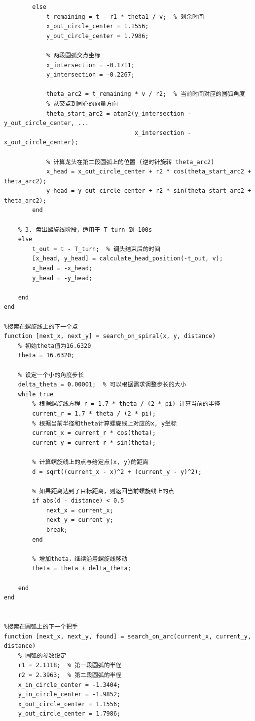\documentclass{cumcmthesis1}
\begin{document}
\begin{lstlisting}[caption={求解问题5的代码，将过程和结果打印到控制台上}, label={lst:tenth_code}]
        % 第二段圆弧运动：从 r1 * theta1 到 T_turn
        else
            t_remaining = t - r1 * theta1 / v;  % 剩余时间
            x_out_circle_center = 1.1556;
            y_out_circle_center = 1.7986;
            
            % 两段圆弧交点坐标
            x_intersection = -0.1711;
            y_intersection = -0.2267;
            
            theta_arc2 = t_remaining * v / r2;  % 当前时间对应的圆弧角度
            % 从交点到圆心的向量方向
            theta_start_arc2 = atan2(y_intersection - y_out_circle_center, ...
                                     x_intersection - x_out_circle_center);
                                 
            % 计算龙头在第二段圆弧上的位置 (逆时针旋转 theta_arc2)
            x_head = x_out_circle_center + r2 * cos(theta_start_arc2 + theta_arc2);  
            y_head = y_out_circle_center + r2 * sin(theta_start_arc2 + theta_arc2);  
        end
    
    % 3. 盘出螺旋线阶段，适用于 T_turn 到 100s
    else
        t_out = t - T_turn;  % 调头结束后的时间
        [x_head, y_head] = calculate_head_position(-t_out, v);
        x_head = -x_head;
        y_head = -y_head;
        
    end
end

%搜索在螺旋线上的下一个点
function [next_x, next_y] = search_on_spiral(x, y, distance)
    % 初始theta值为16.6320
    theta = 16.6320;
    
    % 设定一个小的角度步长
    delta_theta = 0.00001;  % 可以根据需求调整步长的大小
    while true
        % 根据螺旋线方程 r = 1.7 * theta / (2 * pi) 计算当前的半径
        current_r = 1.7 * theta / (2 * pi);
        % 根据当前半径和theta计算螺旋线上对应的x, y坐标
        current_x = current_r * cos(theta);
        current_y = current_r * sin(theta);
        
        % 计算螺旋线上的点与给定点(x, y)的距离
        d = sqrt((current_x - x)^2 + (current_y - y)^2);
        
        % 如果距离达到了目标距离，则返回当前螺旋线上的点
        if abs(d - distance) < 0.5
            next_x = current_x;
            next_y = current_y;
            break;
        end
        
        % 增加theta，继续沿着螺旋线移动
        theta = theta + delta_theta;

    end
end


%搜索在圆弧上的下一个把手
function [next_x, next_y, found] = search_on_arc(current_x, current_y, distance)
    % 圆弧的参数设定
    r1 = 2.1118;  % 第一段圆弧的半径
    r2 = 2.3963;  % 第二段圆弧的半径
    x_in_circle_center = -1.3404;
    y_in_circle_center = -1.9852;
    x_out_circle_center = 1.1556;
    y_out_circle_center = 1.7986;


\end{lstlisting}
\end{document}
